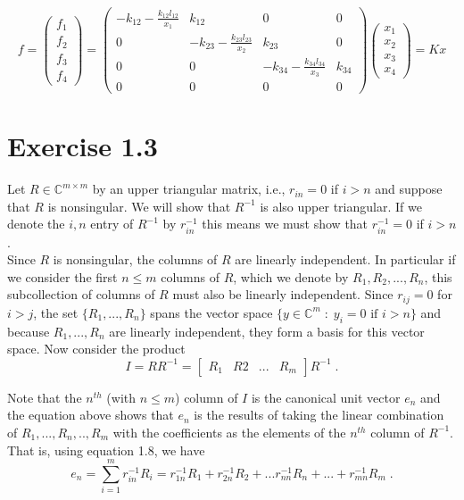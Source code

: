 \documentclass[11pt]{article}
\begin{document}
$$f = \begin{pmatrix} f_1 \\ f_2 \\ f_3 \\ f_4
\end{pmatrix} =
\begin{pmatrix}
-k_{12}-\frac{k_{12}l_{12}}{x_1} & k_{12} & 0 & 0 \\ 0 & -k_{23}-\frac{k_{23}l_{23}}{x_2} & k_{23} & 0 \\
0 & 0 & -k_{34}-\frac{k_{34}l_{34}}{x_3} & k_{34} \\ 0 & 0 & 0 & 0
\end{pmatrix}
\begin{pmatrix} x_1 \\ x_2 \\ x_3 \\x_4
\end{pmatrix} = Kx$$

\section*{Exercise 1.3}

Let $R \in \mathbb{C}^{m\times m}$ by an upper triangular matrix, i.e., $r_{in} = 0$ if $i>n$ and suppose that $R$ is nonsingular. We will show that $R^{-1}$ is also upper triangular. If we denote the $i,n$ entry of $R^{-1}$ by $r_{in}^{-1}$ this means we must show that $r_{in}^{-1} = 0$ if $i>n$.\\

Since $R$ is nonsingular, the columns of $R$ are linearly independent. In particular if we consider the first $n \leq m$ columns of $R$, which we denote by $R_1, R_2,...,R_n$, this subcollection of columns of $R$ must also be linearly independent. Since $r_{ij} = 0$ for $i>j$, the set $\{R_1,...,R_n\}$ spans the vector space $\{ y \in \mathbb{C}^m \; : \; y_i = 0 \text{ if } i>n\}$ and because $R_1,...,R_n$ are linearly independent, they form a basis for this vector space. Now consider the product
$$I = RR^{-1} = \begin{bmatrix} R_1 & R2 & ... & R_m \end{bmatrix} R^{-1} \;.$$ 

Note that the $n^{th}$ (with $n\leq m$) column of $I$ is the canonical unit vector $e_n$ and the equation above shows that $e_n$ is the results of taking the linear combination of $R_1,...,R_n,..,R_m$ with the coefficients as the elements of the $n^{th}$ column of $R^{-1}$. That is, using equation 1.8, we have
$$e_n = \sum_{i=1}^{m} r_{in}^{-1}R_i = r_{1n}^{-1}R_1 + r_{2n}^{-1}R_2 + ... r_{nn}^{-1}R_n + ... + r_{mn}^{-1}R_m \;.$$
\end{document}
